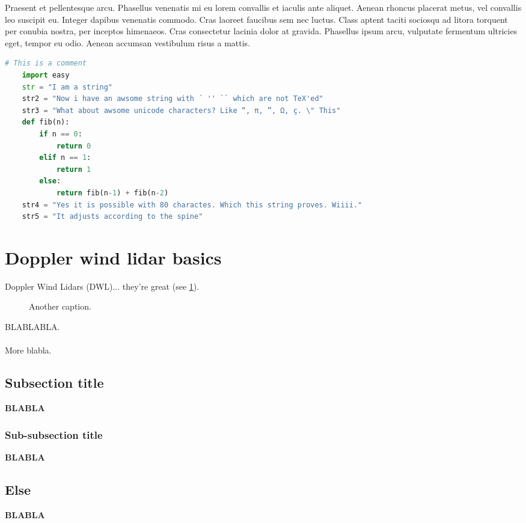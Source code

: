 Praesent et pellentesque arcu. Phasellus venenatis mi eu lorem convallis et iaculis ante aliquet. Aenean rhoncus placerat metus, vel convallis leo suscipit eu. Integer dapibus venenatis commodo. Cras laoreet faucibus sem nec luctus. Class aptent taciti sociosqu ad litora torquent per conubia nostra, per inceptos himenaeos. Cras consectetur lacinia dolor at gravida. Phasellus ipsum arcu, vulputate fermentum ultricies eget, tempor eu odio. Aenean accumsan vestibulum risus a mattis.

\begin{adjustwidth*}{0cm}{-0.4cm}
	\begin{lstlisting}[language=Python,caption=Fibonacci2,label=Fibonacci2]
	# This is a comment
	import easy
	str = "I am a string"
	str2 = "Now i have an awsome string with ´ '' `` which are not TeX'ed"
	str3 = "What about awsome unicode characters? Like “, π, ”, Ω, ç. \" This"
	def fib(n):
	    if n == 0:
	        return 0
	    elif n == 1:
	        return 1
	    else:
	        return fib(n-1) + fib(n-2)
	str4 = "Yes it is possible with 80 charactes. Which this string proves. Wiiii."
	str5 = "It adjusts according to the spine"
	\end{lstlisting}
\end{adjustwidth*}
\section{Doppler wind lidar basics}
\label{sec:ch1_lid_basics}
Doppler Wind Lidars (DWL)... they're great (see \ref{fig:NothingElseMatters}).  
\begin{figure}[h!]%
	\centering
	\vspace*{-4mm}
	\caption{Another caption.}
	\label{fig:NothingElseMatters}	
	\setlength{\belowcaptionskip}{-20pt}
\end{figure}
BLABLABLA. 
\\\\
More blabla.
\subsection{Subsection title}
\label{subsec:ch1_subsectitle}    
\textbf{\color{red}BLABLA}
\subsubsection{Sub-subsection title}
\label{subsubsec:blabla1}    
\textbf{\color{red}BLABLA}
\subsection{Else}
\label{subsec:ch1_else}    
\textbf{\color{red}BLABLA}